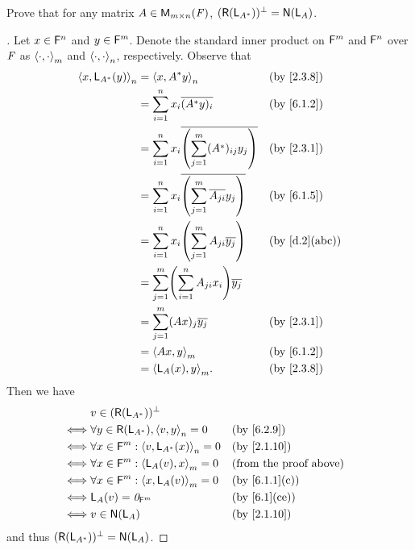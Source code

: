 \begin{ex}\label{ex:6.2.12}
	Prove that for any matrix \(A \in \ms\), \((\rg{\L_{A^*}})^{\perp} = \ns{\L_A}\).
\end{ex}

\begin{proof}[]
	Let \(x \in \mathsf{F}^n\) and \(y \in \mathsf{F}^m\).
	Denote the standard inner product on \(\mathsf{F}^m\) and \(\mathsf{F}^n\) over \(\mathit{F}\) as \(\left\langle\cdot, \cdot\right\rangle_m\) and \(\left\langle\cdot, \cdot\right\rangle_n\), respectively.
	Observe that
	\begin{align*}
		\inn{x, \L_{A^*}(y)}_n & = \inn{x, A^* y}_n                                                 &  & \by{2.3.8}    \\
		                       & = \sum_{i = 1}^n x_i \conj{(A^* y)_i}                              &  & \by{6.1.2}    \\
		                       & = \sum_{i = 1}^n x_i \conj{\pa{\sum_{j = 1}^m (A^*)_{i j} y_j}}    &  & \by{2.3.1}    \\
		                       & = \sum_{i = 1}^n x_i \conj{\pa{\sum_{j = 1}^m \conj{A_{j i}} y_j}} &  & \by{6.1.5}    \\
		                       & = \sum_{i = 1}^n x_i \pa{\sum_{j = 1}^m A_{j i} \conj{y_j}}        &  & \by{d.2}[abc] \\
		                       & = \sum_{j = 1}^m \pa{\sum_{i = 1}^n A_{j i} x_i} \conj{y_j}                           \\
		                       & = \sum_{j = 1}^m (Ax)_j \conj{y_j}                                 &  & \by{2.3.1}    \\
		                       & = \inn{Ax, y}_m                                                    &  & \by{6.1.2}    \\
		                       & = \inn{\L_A(x), y}_m.                                              &  & \by{2.3.8}
	\end{align*}
	Then we have
	\begin{align*}
		     & v \in (\rg{\L_{A^*}})^{\perp}                                                          \\
		\iff & \forall y \in \rg{\L_{A^*}}, \inn{v, y}_n = 0       &  & \by{6.2.9}                    \\
		\iff & \forall x \in \vs{F}^m : \inn{v, \L_{A^*}(x)}_n = 0 &  & \by{2.1.10}                   \\
		\iff & \forall x \in \vs{F}^m : \inn{\L_A(v), x}_m = 0     &  & \text{(from the proof above)} \\
		\iff & \forall x \in \vs{F}^m : \inn{x, \L_A(v)}_m = 0     &  & \by{6.1.1}[c]                 \\
		\iff & \L_A(v) = \zv_{\vs{F}^m}                            &  & \by{6.1}[ce]                  \\
		\iff & v \in \ns{\L_A}                                     &  & \by{2.1.10}
	\end{align*}
	and thus \((\rg{\L_{A^*}})^{\perp} = \ns{\L_A}\).
\end{proof}

